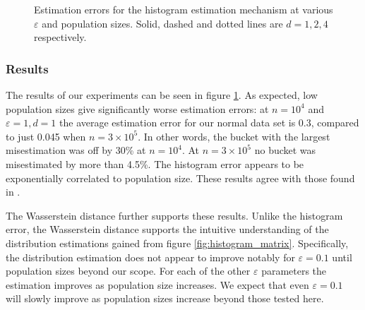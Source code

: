 \documentclass[12pt]{article}
\renewcommand{\epsilon}{\varepsilon}
\begin{document}
\begin{figure}
{    }
    \caption{Estimation errors for the histogram estimation mechanism at various $\epsilon$ and population sizes. Solid, dashed and dotted lines are $d=1,2,4$ respectively.}
    \label{fig:histogram_errors}
\end{figure}

\subsubsection{Results}

The results of our experiments can be seen in figure \ref{fig:histogram_errors}. As expected, low population sizes give significantly worse estimation errors: at $n=10^4$ and $\epsilon=1,d=1$ the average estimation error for our normal data set is 0.3, compared to just 0.045 when $n=3\times10^5$. In other words, the bucket with the largest misestimation was off by 30\% at $n=10^4$. At $n=3\times 10^5$ no bucket was misestimated by more than 4.5\%. The histogram error appears to be exponentially correlated to population size. These results agree with those found in \cite{microsoft_telemetry}.

The Wasserstein distance further supports these results. Unlike the histogram error, the Wasserstein distance supports the intuitive understanding of the distribution estimations gained from figure \ref{fig:histogram_matrix}. Specifically, the distribution estimation does not appear to improve notably for $\epsilon=0.1$ until population sizes beyond our scope. For each of the other $\epsilon$ parameters the estimation improves as population size increases. We expect that even $\epsilon=0.1$ will slowly improve as population sizes increase beyond those tested here. \bigskip
\end{document}
